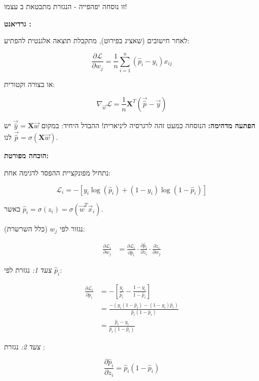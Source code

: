 זו נוסחה יפהפייה - הנגזרת מתבטאת ב עצמו!

\textbf{גרדיאנט :}

לאחר חישובים (שאציג בפירוט), מתקבלת תוצאה אלגנטית להפתיע:

\begin{equation}
\frac{\partial \mathcal{L}}{\partial w_j} = \frac{1}{n}\sum_{i=1}^{n}(\hat{p}_i - y_i)x_{ij}
\end{equation}

או בצורה וקטורית:

\begin{equation}
\nabla_{\vec{w}}\mathcal{L} = \frac{1}{n}\mathbf{X}^T(\vec{\hat{p}} - \vec{y})
\end{equation}

\textbf{הפתעה מדהימה:} הנוסחה כמעט זהה לרגרסיה ליניארית! ההבדל היחיד: במקום $\vec{\hat{y}} = \mathbf{X}\vec{w}$ יש לנו $\vec{\hat{p}} = \sigma(\mathbf{X}\vec{w})$.

\textbf{הוכחה מפורטת:}

נתחיל מפונקציית ההפסד לדגימה אחת:

\begin{equation}
\mathcal{L}_i = -[y_i\log(\hat{p}_i) + (1-y_i)\log(1-\hat{p}_i)]
\end{equation}

כאשר $\hat{p}_i = \sigma(z_i) = \sigma(\vec{w}^T\vec{x}_i)$.

נגזור לפי $w_j$ (כלל השרשרת):

\begin{align}
\frac{\partial \mathcal{L}_i}{\partial w_j} &= \frac{\partial \mathcal{L}_i}{\partial \hat{p}_i} \cdot \frac{\partial \hat{p}_i}{\partial z_i} \cdot \frac{\partial z_i}{\partial w_j}
\end{align}

\textit{צעד 1:} נגזרת לפי $\hat{p}_i$:

\begin{align}
\frac{\partial \mathcal{L}_i}{\partial \hat{p}_i} &= -\left[\frac{y_i}{\hat{p}_i} - \frac{1-y_i}{1-\hat{p}_i}\right] \nonumber \\
&= \frac{-(y_i(1-\hat{p}_i) - (1-y_i)\hat{p}_i)}{\hat{p}_i(1-\hat{p}_i)} \nonumber \\
&= \frac{\hat{p}_i - y_i}{\hat{p}_i(1-\hat{p}_i)}
\end{align}

\textit{צעד 2:} נגזרת :

\begin{equation}
\frac{\partial \hat{p}_i}{\partial z_i} = \hat{p}_i(1 - \hat{p}_i)
\end{equation}

